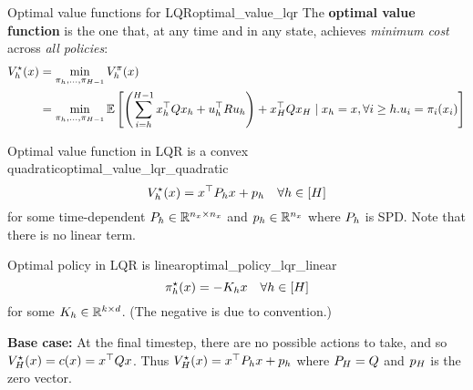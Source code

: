 \documentclass[\main/main]{subfiles}
\begin{document}
\begin{definition}[breakable=false]{Optimal value functions for LQR}{optimal_value_lqr}
    The \textbf{optimal value function} is the one that, at any time and in any state,
    achieves \emph{minimum cost} across \emph{all policies}: \[
        \begin{split}
            V^\star_h(x) &= \min_{\pi_h, \dots, \pi_{H-1}} V^\pi_h(x) \\
            &= \min_{\pi_{h}, \dots, \pi_{H-1}} \operatorname*{\mathbb{E}} \left[ \left( \sum_{i=h}^{H-1} x_h^\top Q x_h + u_h^\top R u_h \right) + x_H^\top Q x_H
            \mid x_h = x, \forall i \ge h. u_i = \pi_i(x_i) \right] \\
        \end{split}
    \]
\end{definition}

\begin{theorem}{Optimal value function in LQR is a convex quadratic}{optimal_value_lqr_quadratic}
    \[
        V^\star_h(x) = x^\top P_h x + p_h \quad \forall h \in [H]
    \]
    for some time-dependent $P_h \in \mathbb{R}^{n_x \times n_x}$ and $p_h \in \mathbb{R}^{n_x}$ where $P_h$ is SPD. Note that there is no linear term.
\end{theorem}

\begin{theorem}{Optimal policy in LQR is linear}{optimal_policy_lqr_linear}
    \[
        \pi^\star_h (x) = - K_h x \quad \forall h \in [H]
    \]
    for some $K_h \in \mathbb{R}^{k \times d}$. (The negative is due to convention.)
\end{theorem}





\textbf{Base case:} At the final timestep, there are no possible actions to take, and so $V^\star_H(x) = c(x) = x^\top Q x$. Thus $V_H^\star(x) = x^\top P_h x + p_h$ where $P_H = Q$ and $p_H$ is the zero vector.
\end{document}
